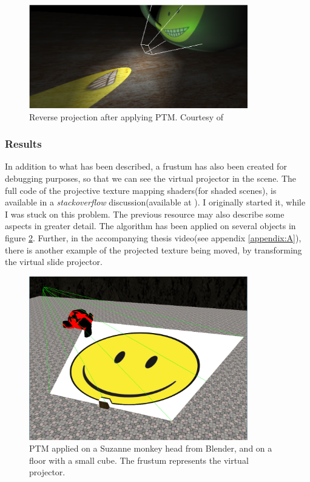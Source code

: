 \documentclass[]{article}
\begin{document}
\begin{figure}[hbtp]
    \centering
    \includegraphics[width=0.85\textwidth]{figures/ReverseProjecton.PNG}
    \caption{Reverse projection after applying PTM. Courtesy of \cite{cassNvidia}}
    \label{fig:ReverseProjection}
\end{figure}

\subsubsection{Results}

In addition to what has been described, a frustum has also been created for debugging purposes, so that we can see the virtual projector in the scene. The full code of the projective texture mapping shaders(for shaded scenes), is available in a \textit{stackoverflow} discussion(available at \cite{avram2014}). I originally started it, while I was stuck on this problem. The previous resource may also describe some aspects in greater detail. The algorithm has been applied on several objects in figure \ref{fig:PTMTest}. Further, in the accompanying thesis video(see appendix \ref{appendix:A}), there is another example of the projected texture being moved, by transforming the virtual slide projector.

\begin{figure}[hbtp]
    \centering
    \includegraphics[width=0.85\textwidth]{figures/PTMTest.png}
    \caption{PTM applied on a Suzanne monkey head from Blender, and on a floor with a small cube. The frustum represents the virtual projector.}
    \label{fig:PTMTest}
\end{figure}
\end{document}
